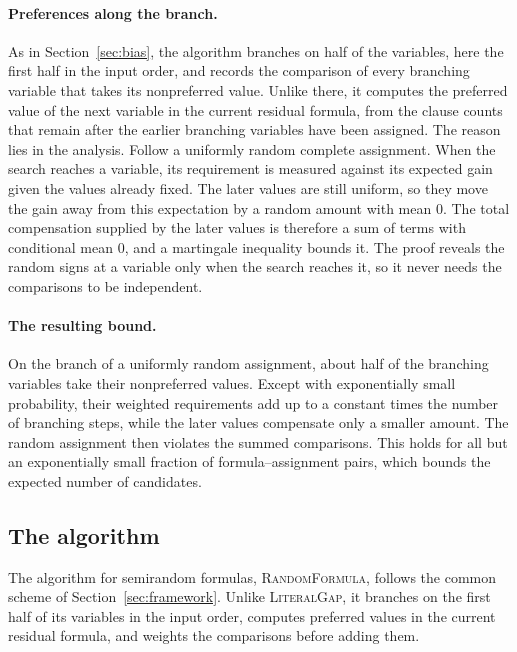 \documentclass[11pt,a4paper]{article}
\theoremstyle{definition}
\theoremstyle{remark}
\begin{document}
\paragraph{Preferences along the branch.}
As in Section~\ref{sec:bias}, the algorithm branches on half of the
variables, here the first half in the input order, and records the
comparison of every branching variable that takes its nonpreferred value.
Unlike there, it computes the preferred value of the next variable in the
current residual formula, from the clause counts that remain after the
earlier branching variables have been assigned. The reason lies in the
analysis. Follow a uniformly random complete assignment. When the search
reaches a variable, its requirement is measured against its expected gain
given the values already fixed. The later values are still uniform, so
they move the gain away from this expectation by a random amount with mean
$0$. The total compensation supplied by the later values is therefore a sum
of terms with conditional mean $0$, and a martingale inequality bounds it.
The proof reveals the random signs at a variable only when the search
reaches it, so it never needs the comparisons to be independent.

\paragraph{The resulting bound.}
On the branch of a uniformly random assignment, about half of the
branching variables take their nonpreferred values. Except with
exponentially small probability, their weighted requirements add up to a
constant times the number of branching steps, while the later values
compensate only a smaller amount. The random assignment then violates the
summed comparisons. This holds for all but an exponentially small fraction
of formula--assignment pairs, which bounds the expected number of
candidates.

\subsection{The algorithm}\label{sec:random_algorithm}\label{sec:random_notation}

The algorithm for semirandom formulas, \textnormal{\textsc{RandomFormula}},
follows the common scheme of Section~\ref{sec:framework}. Unlike
\textnormal{\textsc{LiteralGap}}, it branches on the first half of its
variables in the input order, computes preferred values in the current
residual formula, and weights the comparisons before adding them.
\end{document}
